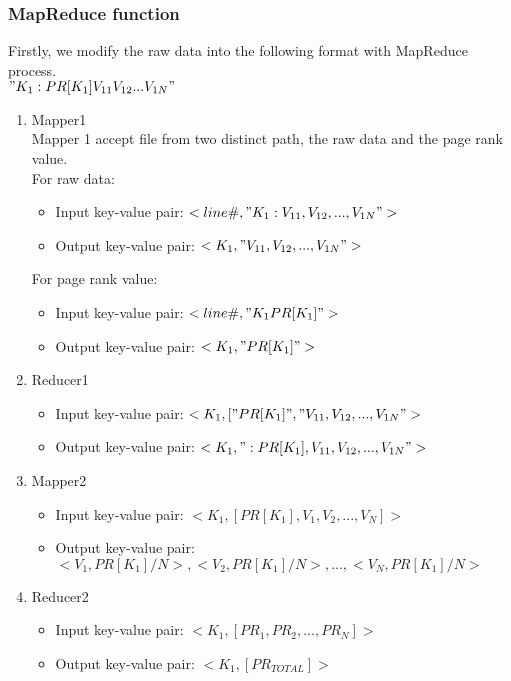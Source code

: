 \documentclass[a4paper]{article}
\begin{document}
\subsubsection{MapReduce function}
Firstly, we modify the raw data into the following format with MapReduce process.\\
$"K_1:PR[K_1] V_{11} V_{12} ... V_{1N}"$
\begin{enumerate}
	\item Mapper1\\
	
	Mapper 1 accept file from two distinct path, the raw data and the page rank value.\\
	
	For raw data:
	\begin{itemize}
		\item Input key-value pair: $<line \#, "K_1: V_{11}, V_{12}, ... ,V_{1N}">$
		\item Output key-value pair: $<K_1, "V_{11}, V_{12}, ... ,V_{1N}">$
	\end{itemize}
	For page rank value:
	\begin{itemize}
		\item Input key-value pair: $<line \#, "K_1 PR[K_1]">$
		\item Output key-value pair: $<K_1, "PR[K_1]">	$
	\end{itemize}
	
	\item Reducer1
	\begin{itemize}	
		\item Input key-value pair: $<K_1, ["PR[K_1]", "V_{11}, V_{12}, ... ,V_{1N}">$
		\item Output key-value pair: $<K_1, ":PR[K_1], V_{11}, V_{12}, ... ,V_{1N}">$
	\end{itemize}
	
	\item Mapper2
	\begin{itemize}
		\item Input key-value pair: $<K_1, [PR[K_1], V_1, V_2, ..., V_N]>$
		\item Output key-value pair: $<V_1, PR[K_1] / N>, <V_2, PR[K_1] / N>, ..., <V_N, PR[K_1] / N>$
	\end{itemize}
	
	\item Reducer2
	\begin{itemize}
		\item Input key-value pair: $<K_1, [PR_1, PR_2, ..., PR_N]>$
		\item Output key-value pair: $<K_1, [PR_{TOTAL}]>$
	\end{itemize}
\end{enumerate}
\end{document}
